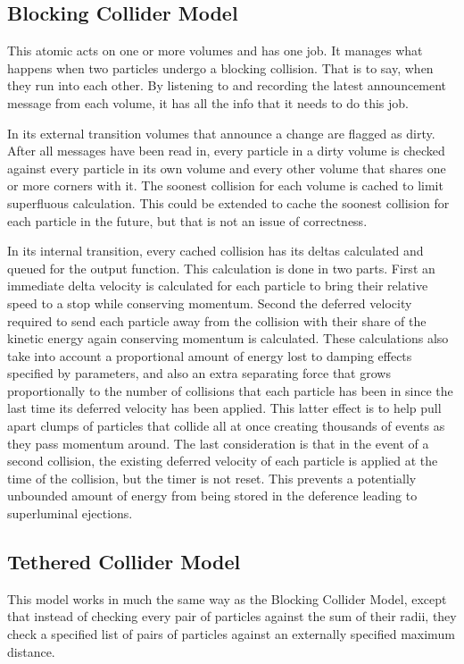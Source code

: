 \documentclass[conference]{IEEEtran}
\begin{document}
\subsection{Blocking Collider Model}

This atomic acts on one or more volumes and has one job. It manages what happens when two particles undergo a blocking collision. That is to say, when they run into each other. By listening to and recording the latest announcement message from each volume, it has all the info that it needs to do this job.

In its external transition volumes that announce a change are flagged as dirty. After all messages have been read in, every particle in a dirty volume is checked against every particle in its own volume and every other volume that shares one or more corners with it. The soonest collision for each volume is cached to limit superfluous calculation. This could be extended to cache the soonest collision for each particle in the future, but that is not an issue of correctness.

In its internal transition, every cached collision has its deltas calculated and queued for the output function. This calculation is done in two parts. First an immediate delta velocity is calculated for each particle to bring their relative speed to a stop while conserving momentum. Second the deferred velocity required to send each particle away from the collision with their share of the kinetic energy again conserving momentum is calculated. These calculations also take into account a proportional amount of energy lost to damping effects specified by parameters, and also an extra separating force that grows proportionally to the number of collisions that each particle has been in since the last time its deferred velocity has been applied. This latter effect is to help pull apart clumps of particles that collide all at once creating thousands of events as they pass momentum around. The last consideration is that in the event of a second collision, the existing deferred velocity of each particle is applied at the time of the collision, but the timer is not reset. This prevents a potentially unbounded amount of energy from being stored in the deference leading to superluminal ejections.

\subsection{Tethered Collider Model}
This model works in much the same way as the Blocking Collider Model, except that instead of checking every pair of particles against the sum of their radii, they check a specified list of pairs of particles against an externally specified maximum distance.
\end{document}
